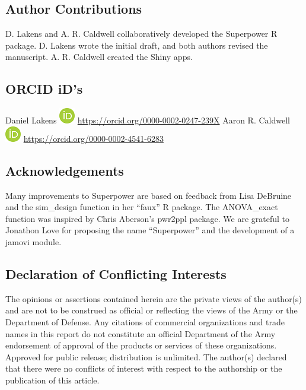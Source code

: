 \documentclass[
  english,
  ,jou,floatsintext]{apa6}
\begin{document}
\hypertarget{author-contributions}{%
\subsection{Author Contributions}\label{author-contributions}}

D. Lakens and A. R. Caldwell collaboratively developed the Superpower R package. D. Lakens wrote the initial draft, and both authors revised the manuscript. A. R. Caldwell created the Shiny apps.

\hypertarget{orcid-ids}{%
\subsection{ORCID iD's}\label{orcid-ids}}

Daniel Lakens \includegraphics{screenshots/orcid.png} \url{https://orcid.org/0000-0002-0247-239X}
Aaron R. Caldwell \includegraphics{screenshots/orcid.png} \url{https://orcid.org/0000-0002-4541-6283}

\hypertarget{acknowledgements}{%
\subsection{Acknowledgements}\label{acknowledgements}}

Many improvements to Superpower are based on feedback from Lisa DeBruine and the sim\_design function in her \enquote{faux} R package. The ANOVA\_exact function was inspired by Chris Aberson's pwr2ppl package. We are grateful to Jonathon Love for proposing the name \enquote{Superpower} and the development of a jamovi module.

\hypertarget{declaration-of-conflicting-interests}{%
\subsection{Declaration of Conflicting Interests}\label{declaration-of-conflicting-interests}}

The opinions or assertions contained herein are the private views of the author(s) and are not to be construed as official or reflecting the views of the Army or the Department of Defense. Any citations of commercial organizations and trade names in this report do not constitute an official Department of the Army endorsement of approval of the products or services of these organizations. Approved for public release; distribution is unlimited. The author(s) declared that there were no conflicts of interest with respect to the authorship or the publication of this article.
\end{document}

